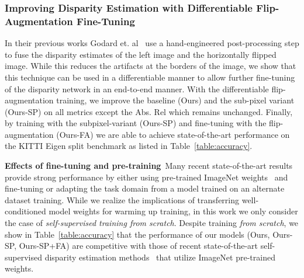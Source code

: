 \documentclass[letterpaper, 10 pt, conference]{ieeeconf}  \IEEEoverridecommandlockouts
\begin{document}
\subsubsection{Improving Disparity Estimation with Differentiable Flip-Augmentation Fine-Tuning}
In their previous works Godard et. al~\cite{godard2017unsupervised,godard2018digging} use a hand-engineered post-processing step to fuse the disparity estimates of the left image and the horizontally flipped image. While this reduces the artifacts at the borders of the image, we show that this technique can be used in a differentiable manner to allow further fine-tuning of the disparity network in an end-to-end manner. With the differentiable flip-augmentation training, we improve the baseline (Ours) and the sub-pixel variant (Ours-SP) on all metrics except the Abs. Rel which remains unchanged. Finally, by training with the subpixel-variant (Ours-SP) and fine-tuning with the flip-augmentation (Ours-FA) we are able to achieve state-of-the-art performance on the KITTI Eigen split benchmark as listed in Table~\ref{table:accuracy}.

\textbf{Effects of fine-tuning and pre-training}~Many recent state-of-the-art results~\cite{godard2018digging,guo2018learning} provide strong performance by either using pre-trained ImageNet weights~\cite{he2016deep} and fine-tuning or adapting the task domain from a model trained on an alternate dataset training. While we realize the implications of transferring well-conditioned model weights for warming up training, in this work we only consider the case of \textit{self-supervised training from scratch}. Despite training \textit{from scratch}, we show in Table~\ref{table:accuracy} that the performance of our models (Ours, Ours-SP, Ours-SP+FA) are competitive with those of recent state-of-the-art self-supervised disparity estimation methods~\cite{godard2017unsupervised,godard2018digging,guo2018learning} that utilize ImageNet pre-trained weights. 
\end{document}
